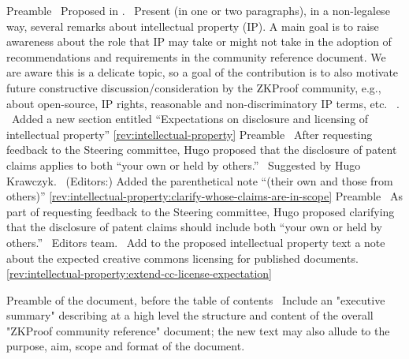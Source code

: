 Preamble
\newcol \ccontext\ Proposed in .
				\propContrib\ Present (in one or two paragraphs), in a non-legalese way, several remarks about intellectual property (IP). A main goal is to raise awareness about the role that IP may take or might not take in the adoption of recommendations and requirements in the community reference document. We are aware this is a delicate topic, so a goal of the contribution is to also motivate future constructive discussion/consideration by the ZKProof community, e.g., about open-source, IP rights, reasonable and non-discriminatory IP terms, etc.
\newcol {}
\newcol \contributors\ \NISTPECteam.
				\Chan\ Added a new section entitled ``Expectations on disclosure and licensing of intellectual property''
\newcol \ref{rev:intellectual-property}
\rowendL
Preamble
\newcol \propContrib\ After requesting feedback to the Steering committee, Hugo proposed 
that the disclosure of patent claims applies to both ``your own or held by others.''
\newcol {}
\newcol \contributors\ Suggested by Hugo Krawczyk.
				\Chan\ (Editors:) Added the parenthetical note ``(their own and those from others)''
\newcol \ref{rev:intellectual-property:clarify-whose-claims-are-in-scope}
\rowendL
Preamble
\newcol \propContrib\ As part of requesting feedback to the Steering committee, Hugo proposed 
clarifying that the disclosure of patent claims should include both ``your own or held by others.''
\newcol {}
\newcol \contributors\ Editors team.
				\Chan\ Add to the proposed intellectual property text a note about the expected creative commons licensing for published documents.
\newcol \ref{rev:intellectual-property:extend-cc-license-expectation}
\rowendL
\myendIssue



Preamble of the document, before the table of contents
\newcol \ccontext {}
				\propContrib\ Include an "executive summary" describing at a high level the structure and content of the overall "ZKProof community reference" document; the new text may also allude to the purpose, aim, scope and format of the document.
				
